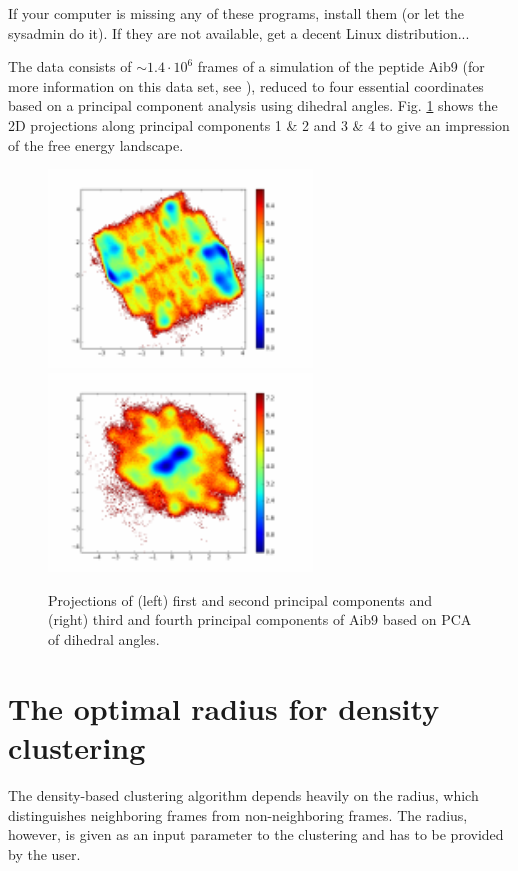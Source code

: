 \documentclass[12pt,a4paper,twoside,english,fleqn]{article}
\begin{document}
If your computer is missing any of these programs, install them (or let the
sysadmin do it). If they are not available, get a decent Linux distribution...

The data consists of $\sim 1.4 \cdot 10^6$ frames of a simulation of the
peptide Aib9 (for more information on this data set, see \cite{Buchenberg15}),
reduced to four essential coordinates based on a principal
component analysis using dihedral angles.
Fig. \ref{fig:pca_proj} shows the 2D projections along principal components
1 \& 2 and 3 \& 4 to give an impression of the free energy landscape.

\begin{figure}
  \centerline{
    \includegraphics[width=7cm] {aib9_pca_pc1_pc2}
    \hspace{1cm}
    \includegraphics[width=7cm] {aib9_pca_pc3_pc4}}
  \caption{\label{fig:pca_proj}
    Projections of (left) first and second principal components
    and (right) third and fourth principal components of
    Aib9 based on PCA of dihedral angles.}
\end{figure}


\section{The optimal radius for density clustering}
The density-based clustering algorithm depends heavily on the radius, which
distinguishes neighboring frames from non-neighboring frames.
The radius, however, is given as an input parameter to the clustering and has
to be provided by the user.
\end{document}
